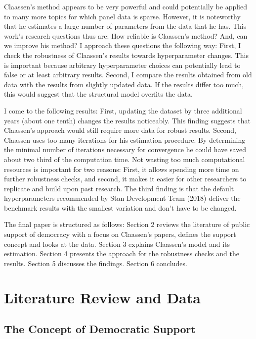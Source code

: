 \documentclass[12pt,english,a4paper,oneside]{article}
\theoremstyle{definition}
\theoremstyle{definition}
\theoremstyle{definition}
\theoremstyle{definition}
\theoremstyle{remark}
\begin{document}
Claassen's method appears to be very powerful and could potentially be applied to many more topics for which panel data is sparse. However, it is noteworthy that he estimates a large number of parameters from the data that he has. This work's research questions thus are: How reliable is Claassen's method? And, can we improve his method? I approach these questions the following way: First, I check the robustness of Claassen's results towards hyperparameter changes. This is important because arbitrary hyperparameter choices can potentially lead to false or at least arbitrary results. Second, I compare the results obtained from old data with the results from slightly updated data. If the results differ too much, this would suggest that the structural model overfits the data.

I come to the following results: First, updating the dataset by three additional years (about one tenth) changes the results noticeably. This finding suggests that Claassen's approach would still require more data for robust results.
Second, Claassen uses too many iterations for his estimation procedure. By determining the minimal number of iterations necessary for convergence he could have saved about two third of the computation time. Not wasting too much computational resources is important for two reasons: First, it allows spending more time on further robustness checks, and second, it makes it easier for other researchers to replicate and build upon past research. The third finding is that the default hyperparameters recommended by Stan Development Team (2018) deliver the benchmark results with the smallest variation and don't have to be changed.

The final paper is structured as follows: Section 2 reviews the literature of public support of democracy with a focus on Claassen's papers, defines the support concept and looks at the data. Section 3 explains Claassen's model and its estimation. Section 4 presents the approach for the robustness checks and the results. Section 5 discusses the findings. Section 6 concludes.

\hypertarget{literature-review-and-data}{%
\section{Literature Review and Data}\label{literature-review-and-data}}

\hypertarget{the-concept-of-democratic-support}{%
\subsection{The Concept of Democratic Support}\label{the-concept-of-democratic-support}}
\end{document}
